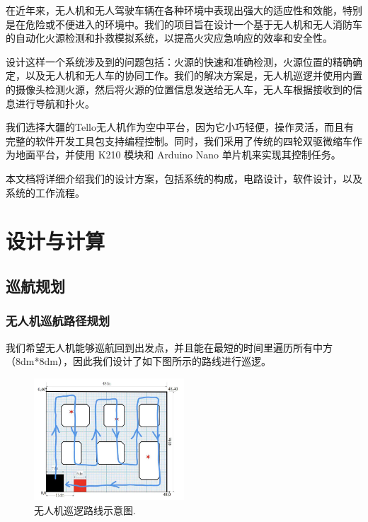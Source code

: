 \documentclass[12pt, a4paper, oneside]{article}
\begin{document}
在近年来，无人机和无人驾驶车辆在各种环境中表现出强大的适应性和效能，特别是在危险或不便进入的环境中。我们的项目旨在设计一个基于无人机和无人消防车的自动化火源检测和扑救模拟系统，以提高火灾应急响应的效率和安全性。

设计这样一个系统涉及到的问题包括：火源的快速和准确检测，火源位置的精确确定，以及无人机和无人车的协同工作。我们的解决方案是，无人机巡逻并使用内置的摄像头检测火源，然后将火源的位置信息发送给无人车，无人车根据接收到的信息进行导航和扑火。

我们选择大疆的Tello无人机作为空中平台，因为它小巧轻便，操作灵活，而且有完整的软件开发工具包支持编程控制。同时，我们采用了传统的四轮双驱微缩车作为地面平台，并使用 K210 模块和 Arduino Nano 单片机来实现其控制任务。

本文档将详细介绍我们的设计方案，包括系统的构成，电路设计，软件设计，以及系统的工作流程。

\section{设计与计算}

\subsection{巡航规划}

\subsubsection{无人机巡航路径规划}

我们希望无人机能够巡航回到出发点，并且能在最短的时间里遍历所有中方（8dm*8dm），因此我们设计了如下图所示的路线进行巡逻。

\begin{figure}[H]
    \centering
    \includegraphics[width=0.5\textwidth]{bff91c46fc5f6f6031116739473424e.jpg}
    \caption{无人机巡逻路线示意图.}
    \label{无人机巡逻路线示意图}
\end{figure}
\end{document}
